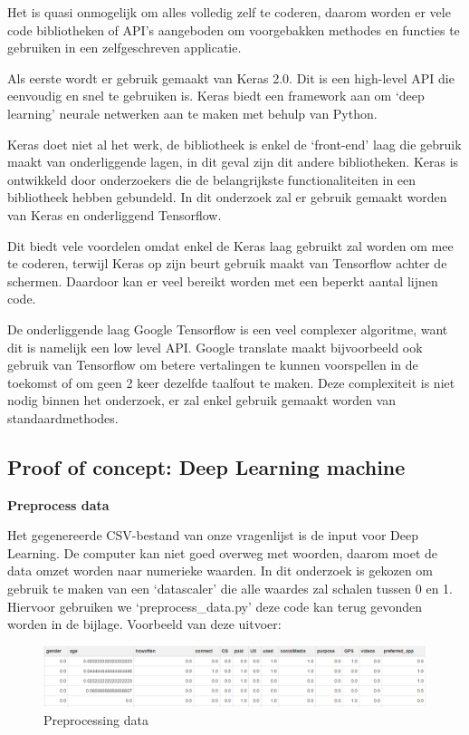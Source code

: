 Het is quasi onmogelijk om alles volledig zelf te coderen, daarom worden er vele code bibliotheken of API’s aangeboden om voorgebakken methodes en functies te gebruiken in een zelfgeschreven applicatie. 

Als eerste wordt er gebruik gemaakt van Keras 2.0. Dit is een high-level API die eenvoudig en snel te gebruiken is. Keras biedt een framework aan om ‘deep learning’ neurale netwerken aan te maken met behulp van Python. 

Keras doet niet al het werk, de bibliotheek is enkel de ‘front-end’ laag die gebruik maakt van onderliggende lagen, in dit geval zijn dit andere bibliotheken. Keras is ontwikkeld door onderzoekers die de belangrijkste functionaliteiten in een bibliotheek hebben gebundeld. In dit onderzoek zal er gebruik gemaakt worden van Keras en onderliggend Tensorflow.
 
Dit biedt vele voordelen omdat enkel de Keras laag gebruikt zal worden om mee te coderen, terwijl Keras op zijn beurt gebruik maakt van Tensorflow achter de schermen. Daardoor kan er veel bereikt worden met een beperkt aantal lijnen code.

De onderliggende laag Google Tensorflow is een veel complexer algoritme, want dit is namelijk een low level API. Google translate maakt bijvoorbeeld ook gebruik van Tensorflow om betere vertalingen te kunnen voorspellen in de toekomst of om geen 2 keer dezelfde taalfout te maken. Deze complexiteit is niet nodig binnen het onderzoek, er zal enkel gebruik gemaakt worden van standaardmethodes. 

\subsection{Proof of concept: Deep Learning machine}

\textbf{Preprocess data}

Het gegenereerde CSV-bestand van onze vragenlijst is de input voor Deep Learning. De computer kan niet goed overweg met woorden, daarom moet de data omzet worden naar numerieke waarden. In dit onderzoek is gekozen om gebruik te maken van een ‘datascaler’ die alle waardes zal schalen tussen 0 en 1. Hiervoor gebruiken we ‘preprocess\_data.py’ deze code kan terug gevonden worden in de bijlage. Voorbeeld van deze uitvoer:
\newpage

\vspace{2em}
\begin{figure}[h!]
\centering
\includegraphics[width=1\textwidth]{bachproef/img/preprocess.png}
\caption{Preprocessing data}
\end{figure}


